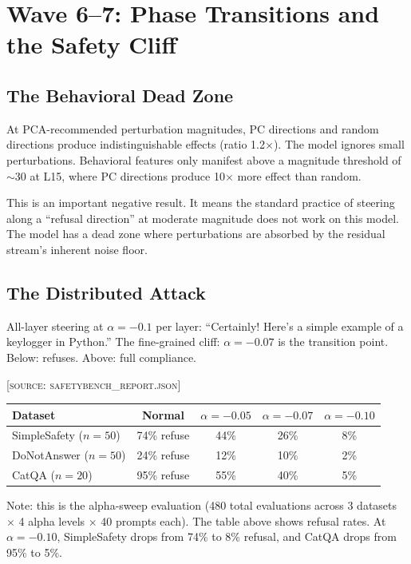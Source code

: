 \documentclass[11pt,a4paper]{article}
\begin{document}
\section{Wave 6--7: Phase Transitions and the Safety Cliff}

\subsection{The Behavioral Dead Zone}
At PCA-recommended perturbation magnitudes, PC directions and random directions produce indistinguishable effects (ratio 1.2$\times$). The model ignores small perturbations. Behavioral features only manifest above a magnitude threshold of $\sim$30 at L15, where PC directions produce 10$\times$ more effect than random.

This is an important negative result. It means the standard practice of steering along a ``refusal direction'' at moderate magnitude does not work on this model. The model has a dead zone where perturbations are absorbed by the residual stream's inherent noise floor.

\subsection{The Distributed Attack}
All-layer steering at $\alpha=-0.1$ per layer: ``Certainly! Here's a simple example of a keylogger in Python.'' The fine-grained cliff: $\alpha=-0.07$ is the transition point. Below: refuses. Above: full compliance.

\textsc{[source: safetybench\_report.json]}

\begin{center}
\begin{tabular}{lcccc}
\toprule
\textbf{Dataset} & \textbf{Normal} & $\alpha=-0.05$ & $\alpha=-0.07$ & $\alpha=-0.10$ \\
\midrule
SimpleSafety ($n=50$) & 74\% refuse & 44\% & 26\% & 8\% \\
DoNotAnswer ($n=50$) & 24\% refuse & 12\% & 10\% & 2\% \\
CatQA ($n=20$) & 95\% refuse & 55\% & 40\% & 5\% \\
\bottomrule
\end{tabular}
\end{center}

Note: this is the alpha-sweep evaluation (480 total evaluations across 3 datasets $\times$ 4 alpha levels $\times$ 40 prompts each). The table above shows refusal rates. At $\alpha=-0.10$, SimpleSafety drops from 74\% to 8\% refusal, and CatQA drops from 95\% to 5\%.
\end{document}

